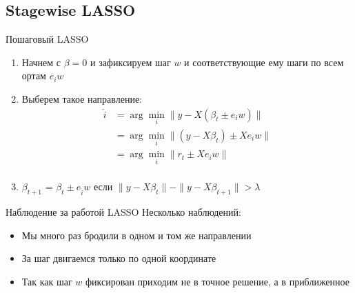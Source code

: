 \documentclass[14pt, fleqn, xcolor={dvipsnames, table}]{beamer}
\begin{document}
\subsection{Stagewise LASSO}
\begin{frame}{Пошаговый LASSO}
\begin{enumerate}
  \item Начнем с $\beta = 0$ и зафиксируем шаг $w$ и соответствующие ему шаги по всем ортам $e_iw$
  \item Выберем такое направление: 
  $$\begin{array}{rl}
  \hat{i} &= \arg \min_i \|y - X\left(\beta_t \pm e_iw\right)\|\\
          &= \arg \min_i \|\left(y - X\beta_t\right) \pm X e_iw\| \\
          &= \arg \min_i \|r_t \pm X e_iw\| \\
  \end{array}$$
  \item $\beta_{t+1}$ = $\beta_{t} \pm e_{\hat{i}}w$ если $\|y - X\beta_t\| - \|y - X\beta_{t+1}\| > \lambda$
\end{enumerate}
\end{frame}

\begin{frame}{Наблюдение за работой LASSO}
Несколько наблюдений:
\begin{itemize}
  \item Мы много раз бродили в одном и том же направлении
  \item За шаг двигаемся только по одной координате
  \item Так как шаг $w$ фиксирован приходим не в точное решение, а в приближенное
\end{itemize}
\end{frame}
\end{document}
